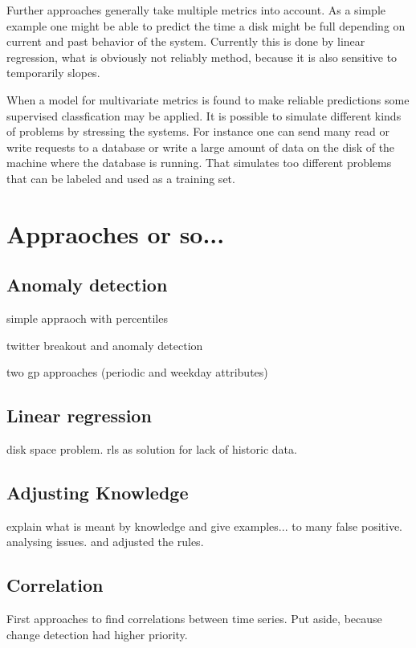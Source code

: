 \documentclass[]{article}
\begin{document}
Further approaches generally take multiple metrics into account.
As a simple example one might be able to predict the time a disk might be full depending on current and past behavior of the system. 
Currently this is done by linear regression, what is obviously not reliably method, because it is also sensitive to temporarily slopes.

When a model for multivariate metrics is found to make reliable predictions some supervised classfication may be applied.
It is possible to simulate different kinds of problems by stressing the systems.
For instance one can send many read or write requests to a database or write a large amount of data on the disk of the machine where the database is running.
That simulates too different problems that can be labeled and used as a training set.

\section{Appraoches or so...}
\subsection{Anomaly detection}

simple appraoch with percentiles

twitter breakout and anomaly detection

two gp approaches (periodic and weekday attributes)

\subsection{Linear regression}
disk space problem. rls as solution for lack of historic data.

\subsection{Adjusting Knowledge}
explain what is meant by knowledge and give examples... to many false positive. analysing issues. and adjusted the rules.

\subsection{Correlation}
First approaches to find correlations between time series. Put aside, because change detection had higher priority.
\end{document}
